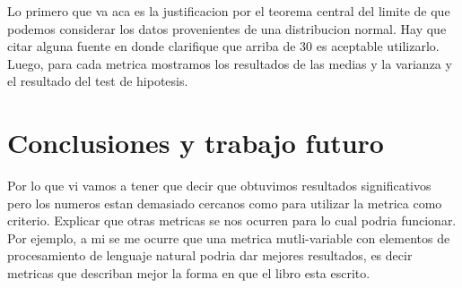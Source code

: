 \documentclass[12pt,journal,compsoc]{IEEEtran}
\begin{document}
Lo primero que va aca es la justificacion por el teorema central del limite de que podemos considerar los datos provenientes de una distribucion normal. Hay que citar alguna fuente en donde clarifique que arriba de 30 es aceptable utilizarlo. Luego, para cada metrica mostramos los resultados de las medias y la varianza y el resultado del test de hipotesis.

\section{Conclusiones y trabajo futuro} Por lo que vi vamos a tener que decir que obtuvimos resultados significativos pero los numeros estan demasiado cercanos como para utilizar la metrica como criterio. Explicar que otras metricas se nos ocurren para lo cual podria funcionar. Por ejemplo, a mi se me ocurre que una metrica mutli-variable con elementos de procesamiento de lenguaje natural podria dar mejores resultados, es decir metricas que describan mejor la forma en que el libro esta escrito.\\


%
\end{document}
